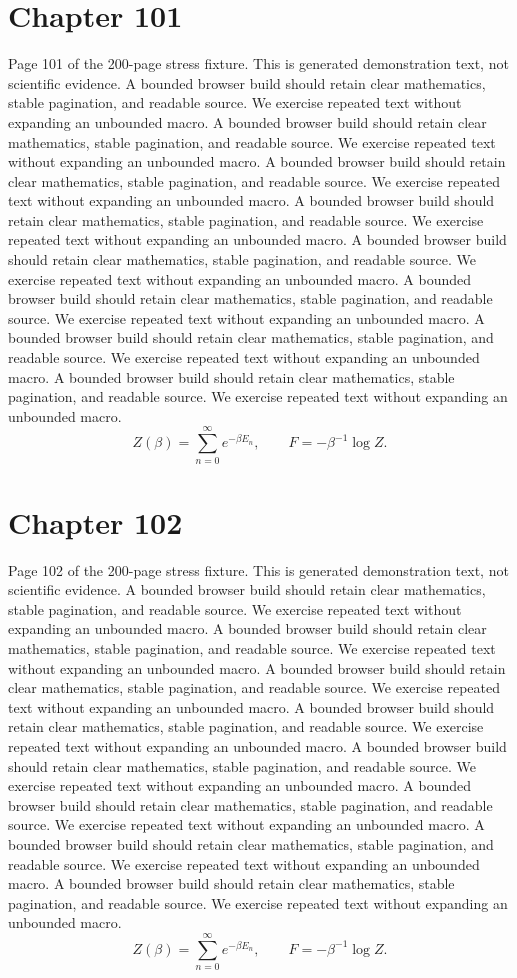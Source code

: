 \documentclass[11pt]{article}
\begin{document}
\section*{Chapter 101}
Page 101 of the 200-page stress fixture. This is generated demonstration text, not scientific evidence.
A bounded browser build should retain clear mathematics, stable pagination, and readable source. We exercise repeated text without expanding an unbounded macro.
A bounded browser build should retain clear mathematics, stable pagination, and readable source. We exercise repeated text without expanding an unbounded macro.
A bounded browser build should retain clear mathematics, stable pagination, and readable source. We exercise repeated text without expanding an unbounded macro.
A bounded browser build should retain clear mathematics, stable pagination, and readable source. We exercise repeated text without expanding an unbounded macro.
A bounded browser build should retain clear mathematics, stable pagination, and readable source. We exercise repeated text without expanding an unbounded macro.
A bounded browser build should retain clear mathematics, stable pagination, and readable source. We exercise repeated text without expanding an unbounded macro.
A bounded browser build should retain clear mathematics, stable pagination, and readable source. We exercise repeated text without expanding an unbounded macro.
A bounded browser build should retain clear mathematics, stable pagination, and readable source. We exercise repeated text without expanding an unbounded macro.
\[Z(\beta)=\sum_{n=0}^{\infty}e^{-\beta E_n},\qquad F=-\beta^{-1}\log Z.\]
\newpage
\section*{Chapter 102}
Page 102 of the 200-page stress fixture. This is generated demonstration text, not scientific evidence.
A bounded browser build should retain clear mathematics, stable pagination, and readable source. We exercise repeated text without expanding an unbounded macro.
A bounded browser build should retain clear mathematics, stable pagination, and readable source. We exercise repeated text without expanding an unbounded macro.
A bounded browser build should retain clear mathematics, stable pagination, and readable source. We exercise repeated text without expanding an unbounded macro.
A bounded browser build should retain clear mathematics, stable pagination, and readable source. We exercise repeated text without expanding an unbounded macro.
A bounded browser build should retain clear mathematics, stable pagination, and readable source. We exercise repeated text without expanding an unbounded macro.
A bounded browser build should retain clear mathematics, stable pagination, and readable source. We exercise repeated text without expanding an unbounded macro.
A bounded browser build should retain clear mathematics, stable pagination, and readable source. We exercise repeated text without expanding an unbounded macro.
A bounded browser build should retain clear mathematics, stable pagination, and readable source. We exercise repeated text without expanding an unbounded macro.
\[Z(\beta)=\sum_{n=0}^{\infty}e^{-\beta E_n},\qquad F=-\beta^{-1}\log Z.\]
\newpage
\end{document}
